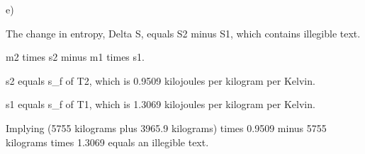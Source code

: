 e)

The change in entropy, Delta S, equals S2 minus S1, which contains illegible text.

m2 times s2 minus m1 times s1.

s2 equals s_f of T2, which is 0.9509 kilojoules per kilogram per Kelvin.

s1 equals s_f of T1, which is 1.3069 kilojoules per kilogram per Kelvin.

Implying (5755 kilograms plus 3965.9 kilograms) times 0.9509 minus 5755 kilograms times 1.3069 equals an illegible text.